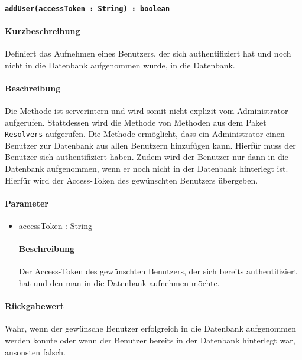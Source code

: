 \paragraph{\texttt{addUser(accessToken : String) : boolean}}%
\paragraph*{Kurzbeschreibung}
Definiert das Aufnehmen eines Benutzers, der sich authentifiziert hat und noch nicht in die Datenbank aufgenommen wurde, in die Datenbank.
\paragraph*{Beschreibung}
Die Methode ist serverintern und wird somit nicht explizit vom Administrator aufgerufen.
Stattdessen wird die Methode von Methoden aus dem Paket \texttt{Resolvers} aufgerufen.
Die Methode ermöglicht, dass ein Administrator einen Benutzer zur Datenbank aus allen Benutzern hinzufügen kann. Hierfür muss der Benutzer sich authentifiziert haben. 
Zudem wird der Benutzer nur dann in die Datenbank aufgenommen, wenn er noch nicht in der Datenbank hinterlegt ist.
Hierfür wird der Access-Token des gewünschten Benutzers übergeben.
\paragraph*{Parameter}
\begin{itemize}
    \item accessToken : String
    		\paragraph*{Beschreibung}
    		Der Access-Token des gewünschten Benutzers, der sich bereits authentifiziert hat und den man in die Datenbank aufnehmen möchte.
\end{itemize}
\paragraph*{Rückgabewert}
Wahr, wenn der gewünsche Benutzer erfolgreich in die Datenbank aufgenommen werden konnte oder wenn der Benutzer bereits in der Datenbank hinterlegt war, ansonsten falsch.
